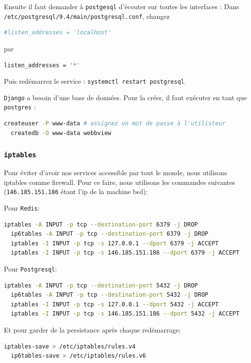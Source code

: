 \documentclass[10pt,a4paper]{article}
\begin{document}
Ensuite il faut demander à \texttt{postgesql} d'écouter sur toutes les interfaces :
Dans \\\texttt{/etc/postgresql/9.4/main/postgresql.conf}, changez
\begin{lstlisting}[language=bash]
  #listen_addresses = 'localhost'
\end{lstlisting}
par
\begin{lstlisting}[language=bash]
  listen_addresses = '*'
\end{lstlisting}

Puis redémarrez le service : \texttt{systemctl restart postgresql}.

\texttt{Django} a besoin d'une base de données.
Pour la créer, il faut exécuter en tant que \texttt{postgres} :
\begin{lstlisting}[language=bash]
  createuser -P www-data # assignez un mot de passe à l'utilisteur
  createdb -O www-data webbview
\end{lstlisting}

\subsubsection{\texttt{iptables}}
Pour éviter d'avoir nos services accessible par tout le monde, nous utilisons iptables comme firewall.
Pour ce faire, nous utilisons les commandes suivantes
(\texttt{146.185.151.186} étant l'ip de la machine bsd):


Pour \texttt{Redis}:
\begin{lstlisting}[language=bash]
  iptables -A INPUT -p tcp --destination-port 6379 -j DROP
  ip6tables -A INPUT -p tcp --destination-port 6379 -j DROP
  iptables -I INPUT -p tcp -s 127.0.0.1 --dport 6379 -j ACCEPT
  iptables -I INPUT -p tcp -s 146.185.151.186 --dport 6379 -j ACCEPT
\end{lstlisting}

Pour \texttt{Postgresql}:
\begin{lstlisting}[language=bash]
  iptables -A INPUT -p tcp --destination-port 5432 -j DROP
  ip6tables -A INPUT -p tcp --destination-port 5432 -j DROP
  iptables -I INPUT -p tcp -s 127.0.0.1 --dport 5432 -j ACCEPT
  iptables -I INPUT -p tcp -s 146.185.151.186 --dport 5432 -j ACCEPT
\end{lstlisting}

Et pour garder de la persistance après chaque redémarrage:
\begin{lstlisting}[language=bash]
  iptables-save > /etc/iptables/rules.v4
  ip6tables-save > /etc/iptables/rules.v6
\end{lstlisting}
\end{document}
